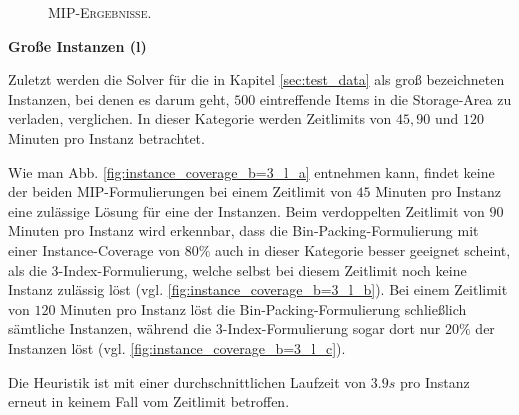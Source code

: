 \begin{figure}[H]
\caption{\textsc{MIP-Ergebnisse.}}
\label{fig:mip_results_b=3_m}
\end{figure}

\pagebreak

\textbf{Große Instanzen (l)}

Zuletzt werden die Solver für die in Kapitel \ref{sec:test_data} als groß bezeichneten Instanzen,
bei denen es darum geht, $500$ eintreffende Items in die Storage-Area zu verladen, verglichen.
In dieser Kategorie werden Zeitlimits von $45, 90$ und $120$ Minuten pro Instanz betrachtet.

Wie man Abb. \ref{fig:instance_coverage_b=3_l_a} entnehmen kann, findet keine der beiden MIP-Formulierungen
bei einem Zeitlimit von $45$ Minuten pro Instanz eine zulässige Lösung für eine der Instanzen.
Beim verdoppelten Zeitlimit von $90$ Minuten pro Instanz wird erkennbar, dass die Bin-Packing-Formulierung
mit einer Instance-Coverage von $80 \%$ auch in dieser Kategorie besser geeignet scheint, als die 3-Index-Formulierung,
welche selbst bei diesem Zeitlimit noch keine Instanz zulässig löst (vgl. \ref{fig:instance_coverage_b=3_l_b}).
Bei einem Zeitlimit von $120$ Minuten pro Instanz löst die Bin-Packing-Formulierung schließlich sämtliche Instanzen,
während die 3-Index-Formulierung sogar dort nur $20 \%$ der Instanzen löst (vgl. \ref{fig:instance_coverage_b=3_l_c}).

Die Heuristik ist mit einer durchschnittlichen Laufzeit von $3.9s$ pro Instanz erneut in keinem Fall
vom Zeitlimit betroffen.

